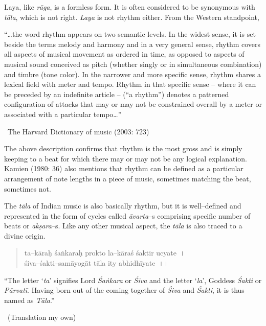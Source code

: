 Laya, like \textit{rāga}, is a formless form. It is often considered to be synonymous with \textit{tāla}, which is not right. \textit{Laya} is not rhythm either. From the Western standpoint,

\begin{myquote}
“…the word rhythm appears on two semantic levels. In the widest sense, it is set beside the terms melody and harmony and in a very general sense, rhythm covers all aspects of musical movement as ordered in time, as opposed to aspects of musical sound conceived as pitch (whether singly or in simultaneous combination) and timbre (tone color). In the narrower and more specific sense, rhythm shares a lexical field with meter and tempo. Rhythm in that specific sense – where it can be preceded by an indefinite article – (“a rhythm”) denotes a patterned configuration of attacks that may or may not be constrained overall by a meter or associated with a particular tempo…” 

~\hfill The Harvard Dictionary of music (2003: 723)
\end{myquote}

The above description confirms that rhythm is the most gross and is simply keeping to a beat for which there may or may not be any logical explanation. Kamien (1980: 36) also mentions that rhythm can be defined as a particular arrangement of note lengths in a piece of music, sometimes matching the beat, sometimes not.

The \textit{tāla} of Indian music is also basically rhythm, but it is well–defined and represented in the form of cycles called \textit{āvarta}–s comprising specific number of beats or \textit{akṣara}–s. Like any other musical aspect, the \textit{tāla} is also traced to a divine origin.

\begin{verse}
ta–kāraḥ śaṅkaraḥ prokto la–kāraś śaktir ucyate~।\\ śiva–śakti–samāyogāt tāla ity abhidhīyate~।।
\end{verse}

\begin{myquote}
“The letter ‘\textit{ta}’ signifies Lord \textit{Śaṅkara} or \textit{Śiva} and the letter ‘\textit{la}’, Goddess \textit{Śakti} or \textit{Pārvatī}. Having born out of the coming together of \textit{Śiva} and \textit{Śakti}, it is thus named as \textit{Tāla}.” 

~\hfill (Translation my own)
\end{myquote}

